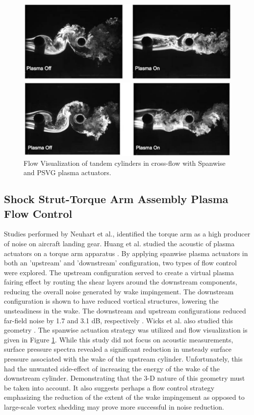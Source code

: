 \begin{figure}
	\begin{center}
		\centerline{\includegraphics[scale=1.0]{figures/tandem_span}}
		\centerline{\includegraphics[scale=1.0]{figures/tandem_psvg}}
		\caption{Flow Visualization of tandem cylinders in cross-flow with Spanwise and PSVG plasma actuators.}
		\label{fig:cyl2}
	\end{center}
\end{figure}

\subsection{Shock Strut-Torque Arm Assembly Plasma Flow Control}

Studies performed by Neuhart et al., identified the torque arm as a high producer of noise on aircraft landing gear. 
Huang et al. studied the acoustic of plasma actuators on a torque arm apparatus \cite{huang2010}. By applying spanwise plasma actuators in both an 'upstream' and 'downstream' configuration, two types of flow control were explored. The upstream configuration served to create a virtual plasma fairing effect by routing the shear layers around the downstream components, reducing the overall noise generated by wake impingement. The downstream configuration is shown to have reduced vortical structures, lowering the unsteadiness in the wake. The downstream and upstream configurations reduced far-field noise by 1.7 and 3.1 dB, respectively \cite{huang2010}.
Wicks et al. also studied this geometry \cite{wicks2015}. The spanwise actuation strategy was utilized and flow visualization is given in Figure \ref{fig:cyl2}. While this study did not focus on acoustic measurements, surface pressure spectra revealed a significant reduction in unsteady surface pressure associated with the wake of the upstream cylinder. Unfortunately, this had the unwanted side-effect of increasing the energy of the wake of the downstream cylinder. Demonstrating that the 3-D nature of this geometry must be taken into account. It also suggests perhaps a flow control strategy emphasizing the reduction of the extent of the wake impingement as opposed to large-scale vortex shedding may prove more successful in noise reduction.

